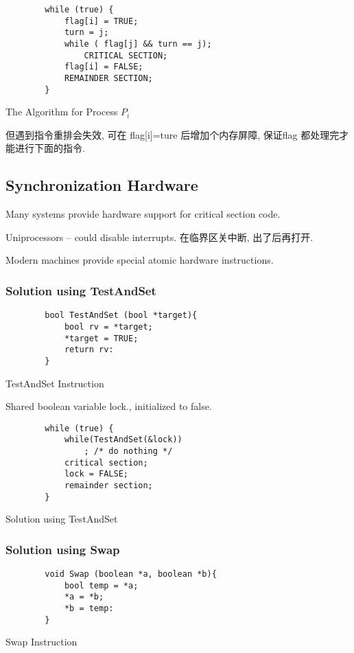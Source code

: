 \begin{code}
    \centering
    \begin{verbatim}
        while (true) {
            flag[i] = TRUE;
            turn = j;
            while ( flag[j] && turn == j);
                CRITICAL SECTION;
            flag[i] = FALSE;
            REMAINDER SECTION;
        }
    \end{verbatim}
    \caption{The Algorithm for Process $P_i$}
\end{code}

但遇到指令重排会失效, 可在 flag[i]=ture  后增加个内存屏障, 保证flag 都处理完才能进行下面的指令. 

\subsection{Synchronization Hardware}
Many systems provide hardware support for critical section code.

Uniprocessors -- could disable interrupts. 在临界区关中断, 出了后再打开.

Modern machines provide special atomic hardware instructions. 

\subsubsection{Solution using TestAndSet}
\begin{code}
    \begin{verbatim}
        bool TestAndSet (bool *target){
            bool rv = *target;
            *target = TRUE;
            return rv:
        }
    \end{verbatim}
    \caption{TestAndSet Instruction}
\end{code}

Shared boolean variable lock., initialized to false. 
 
\begin{code}
    \begin{verbatim}
        while (true) {
            while(TestAndSet(&lock))
                ; /* do nothing */
            critical section;
            lock = FALSE;
            remainder section;
        }
    \end{verbatim}
    \caption{Solution using TestAndSet}
\end{code}

\subsubsection{Solution using Swap}
\begin{code}
    \begin{verbatim}
        void Swap (boolean *a, boolean *b){
            bool temp = *a;
            *a = *b;
            *b = temp:
        }
    \end{verbatim}
    \caption{Swap Instruction}
\end{code}

